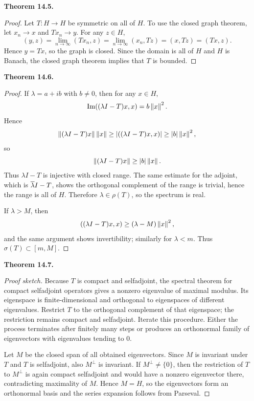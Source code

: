 \documentclass[11pt]{article}
\newenvironment{theoremstmt}[1]{%
  \par\medskip\noindent\textbf{Theorem #1. }\itshape
}{\par\medskip}
\begin{document}
\begin{theoremstmt}{14.5}
\thmHellingerToeplitz
\end{theoremstmt}

\begin{proof}
Let $T:H\to H$ be symmetric on all of $H$. To use the closed graph theorem, let $x_n\to x$ and $Tx_n\to y$. For any $z\in H$,
\[
(y,z)=\lim_{n\to\infty}(Tx_n,z)=\lim_{n\to\infty}(x_n,Tz)=(x,Tz)=(Tx,z).
\]
Hence $y=Tx$, so the graph is closed. Since the domain is all of $H$ and $H$ is Banach, the closed graph theorem implies that $T$ is bounded.
\end{proof}

\begin{theoremstmt}{14.6}
\thmSelfadjointSpectrumReal
\end{theoremstmt}

\begin{proof}
If $\lambda=a+ib$ with $b\neq 0$, then for any $x\in H$,
\[
\operatorname{Im}((\lambda I-T)x,x)=b\left\lVert x\right\rVert^2.
\]
Hence
\[
\left\lVert (\lambda I-T)x\right\rVert\left\lVert x\right\rVert\ge \left\lvert ((\lambda I-T)x,x)\right\rvert\ge \left\lvert b\right\rvert\left\lVert x\right\rVert^2,
\]
so
\[
\left\lVert (\lambda I-T)x\right\rVert\ge \left\lvert b\right\rvert\left\lVert x\right\rVert.
\]
Thus $\lambda I-T$ is injective with closed range. The same estimate for the adjoint, which is $\overline{\lambda} I-T$, shows the orthogonal complement of the range is trivial, hence the range is all of $H$. Therefore $\lambda\in\rho(T)$, so the spectrum is real.

If $\lambda>M$, then
\[
((\lambda I-T)x,x)\ge (\lambda-M)\left\lVert x\right\rVert^2,
\]
and the same argument shows invertibility; similarly for $\lambda<m$. Thus $\sigma(T)\subset[m,M]$.
\end{proof}

\begin{theoremstmt}{14.7}
\thmHilbertSchmidt
\end{theoremstmt}

\begin{proof}[Proof sketch]
Because $T$ is compact and selfadjoint, the spectral theorem for compact selfadjoint operators gives a nonzero eigenvalue of maximal modulus. Its eigenspace is finite-dimensional and orthogonal to eigenspaces of different eigenvalues. Restrict $T$ to the orthogonal complement of that eigenspace; the restriction remains compact and selfadjoint. Iterate this procedure. Either the process terminates after finitely many steps or produces an orthonormal family of eigenvectors with eigenvalues tending to $0$.

Let $M$ be the closed span of all obtained eigenvectors. Since $M$ is invariant under $T$ and $T$ is selfadjoint, also $M^{\perp}$ is invariant. If $M^{\perp}\neq\{0\}$, then the restriction of $T$ to $M^{\perp}$ is again compact selfadjoint and would have a nonzero eigenvector there, contradicting maximality of $M$. Hence $M=H$, so the eigenvectors form an orthonormal basis and the series expansion follows from Parseval.
\end{proof}
\end{document}
